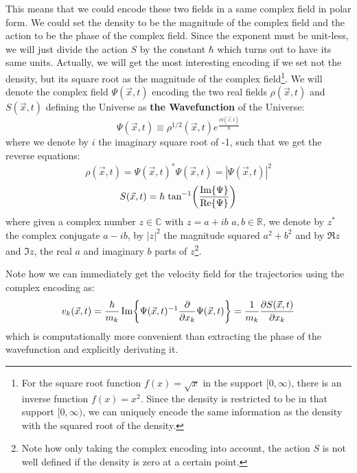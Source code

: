 \documentclass[11pt, a4paper]{article} %
\newcommand{\R}{\mathbb{R}} %
\newcommand{\C}{\mathbb{C}}
\begin{document}
This means that we could encode these two fields in a same complex field in polar form. We could set the density to be the magnitude of the complex field and the action to be the phase of the complex field. Since the exponent must be unit-less, we will just divide the action $S$ by the constant $\hbar$ which turns out to have its same units. Actually, we will get the most interesting encoding if we set not the density, but its square root as the magnitude of the complex field\footnote{For the square root function $f(x)=\sqrt{x}$ in the support $[0,\infty)$, there is an inverse function $f(x)=x^2$. Since the density is restricted to be in that support $[0,\infty)$, we can uniquely encode the same information as the density with the squared root of the density.}. We will denote the complex field $\Psi(\vec{x},t)$ encoding the two real fields $\rho(\vec{x},t)$ and $S(\vec{x},t)$ defining the Universe as {\bf the Wavefunction} of the Universe:
\begin{equation}
\Psi(\vec{x},t)\equiv \rho^{1/2}(\vec{x},t)e^{\frac{iS(\vec{x},t)}{\hbar}}
\end{equation}
where we denote by $i$ the imaginary square root of -1, such that we get the reverse equations:
\begin{equation}
\rho(\vec{x},t)=\Psi(\vec{x},t)^{*}\Psi(\vec{x},t)=|\Psi(\vec{x},t)|^2
\end{equation}
\begin{equation}
S(\vec{x},t)=\hbar \text{ tan}^{-1}\qty(\frac{\Im{\Psi}}{\Re{\Psi}})
\end{equation}
where given a complex number $z\in\C$ with $z=a+ib$ $a,b\in \R$, we denote by $z^{*}$ the complex conjugate $a-ib$, by $|z|^2$ the magnitude squared $a^2+b^2$ and by $\Re{z}$ and $\Im{z}$, the real $a$ and imaginary $b$ parts of $z$\footnote{Note how only taking the complex encoding into account, the action $S$ is not well defined if the density is zero at a certain point.}.

Note how we can immediately get the velocity field for the trajectories using the complex encoding as:
\begin{equation}
v_k(\vec{x},t)=\frac{\hbar}{m_k}\Im{\Psi(\vec{x},t)^{-1}\pdv{}{x_k}\Psi(\vec{x},t)}=\frac{1}{m_k}\pdv{S(\vec{x},t)}{x_k}
\end{equation}
which is computationally more convenient than extracting the phase of the wavefunction and explicitly derivating it.
\end{document}
